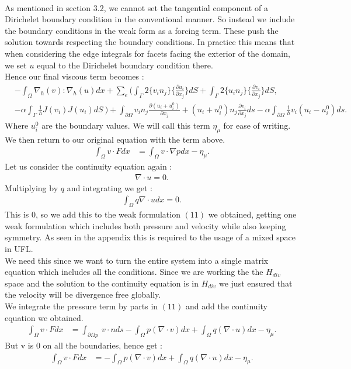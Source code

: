 \documentclass[11pt,twoside,a4paper]{article}
\begin{document}
\\
As mentioned in section 3.2, we cannot set the tangential component of a Dirichelet boundary condition in the conventional manner.  So instead we include the boundary conditions in the weak form as a forcing term. These push the solution towards respecting the boundary conditions. In practice this means that when considering the edge integrals for facets facing the exterior of the domain, we set $u$ equal to the Dirichelet boundary condition there.\\
 Hence our final viscous term becomes :\\
\begin{align*}
&-  \int_\Omega \nabla_h(v) : \nabla_h(u) dx + \sum_e ( \int_\Gamma 2 \{ v_i n_j \} \{ \frac{\partial u_i}{\partial x_j}\} dS + \int_\Gamma 2 \{ u_i n_j \} \{ \frac{\partial v_i}{\partial x_j}\} dS, \\
&- \alpha \int_\Gamma \frac{1}{h}  J(v_i) J(u_i) dS \ ) + \int_{\partial  \Omega} v_i n_j \frac{\partial(u_i + u^0_i)}{\partial x_j} + (u_i + u^0_i) n_j\frac{\partial v_i}{\partial x_j} ds - \alpha \int_{\partial \Omega} \frac{1}{h} v_i(u_i-u^0_i)ds .
\end{align*}
Where $u^0_i$ are the boundary values.
We will call this term $\eta_\mu$ for ease of writing.\\
We then return to our original equation with the term above.
\begin{align}
\int_\Omega v \cdot F dx &= \int_\Omega v \cdot \nabla p dx - \eta_\mu .
\end{align}
Let us consider the continuity equation again :
\begin{align*}
\nabla \cdot u = 0 .
\end{align*}
Multiplying by $q$ and integrating we get :
\begin{align*}
\int_\Omega q \nabla \cdot u dx = 0 .
\end{align*}
This is $0$, so we add this to the weak formulation $(11)$ we obtained, getting one weak formulation which includes both pressure and velocity while also keeping symmetry. As seen in the appendix this is required to the usage of a mixed space in UFL.\\
We need this since we want to turn the entire system into a single matrix equation which includes all the conditions. Since we are working the the $H_{div}$ space and the solution to the continuity equation is in $H_{div}$ we just ensured that the velocity will be divergence free globally.\\
We integrate the pressure term by parts in $(11)$ and add the continuity equation we obtained.
\begin{align}
\int_\Omega v \cdot F dx &= \int_{\partial \Omega p} \ v \cdot n ds - \int_\Omega  p ( \nabla \cdot v) dx + \int_\Omega q (\nabla \cdot u) dx  - \eta_\mu .
\end{align}
But v is $0$ on all the boundaries, hence get :
\begin{align}
\int_\Omega v \cdot F dx &= - \int_\Omega  p ( \nabla \cdot v) dx + \int_\Omega q (\nabla \cdot u) dx  - \eta_\mu .
\end{align}
\end{document}
